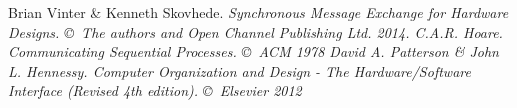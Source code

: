 \begin{thebibliography}{9}
     Brian Vinter \& Kenneth Skovhede. \it{Synchronous Message
        Exchange for Hardware Designs}. \copyright\ The authors and Open
        Channel Publishing Ltd. 2014.
     C.A.R. Hoare. \it{Communicating Sequential Processes}.
        \copyright\ ACM 1978
     David A. Patterson \& John L. Hennessy. \it{Computer
        Organization and Design - The Hardware/Software Interface (Revised 4th
        edition)}.  \copyright\ Elsevier 2012
\end{thebibliography}


